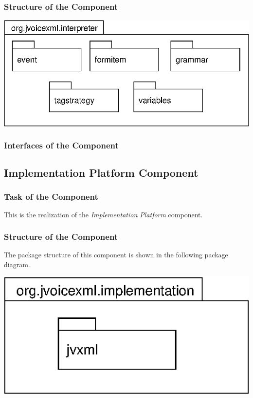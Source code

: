\documentclass[11pt,a4paper]{article}
\begin{document}
\subsubsection{Structure of the Component}

\begin{center}
\includegraphics{package-org.jvoicexml.interpreter.eps}
\end{center}

\subsubsection{Interfaces of the Component}

\subsection{Implementation Platform Component}
\label{sec:impl-platf-comp}

\subsubsection{Task of the Component}

This is the realization of the \emph{Implementation Platform}
component.

\subsubsection{Structure of the Component}

The package structure of this component is shown in the following
package diagram.

\begin{center}
\includegraphics{package-org.jvoicexml.implementation.eps}
\end{center}
\end{document}
